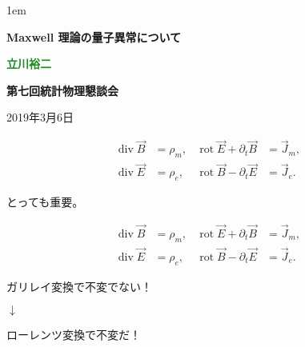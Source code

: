 \documentclass[xcolor={svgnames,rgb}]{beamer}
\date[]{}
\def\bff{\ifmmode\else\bfseries\fi}
\def\green#1{\textcolor{ForestGreen}{\bff #1}}
\def\blue#1{\textcolor{myblue}{\bff #1}}
\begin{document}
\parskip1em 
\boldmath
\def\baselinestretch{1.1}



\def\inc#1{\vcenter{\hbox{\texttt{[image: \#1]}}}}
\def\incc#1{\vcenter{\hbox{\texttt{[image: \#1]}}}}

\begin{frame}
\bigskip\bigskip\bigskip\bigskip\bigskip

\vfill


\begin{exampleblock}{}
\begin{center}\LARGE\bfseries
\color{math}
Maxwell 理論の量子異常について
\end{center}
\end{exampleblock}

\bigskip\bigskip\bigskip
\begin{center}
\large  \green{立川裕二}  

\bigskip
\large \blue{第七回統計物理懇談会}

\bigskip
\large 2019年3月6日
\end{center}
\bigskip\bigskip\bigskip
\vfill


\end{frame}



\def\div{\mathop{\mathrm{div}}}
\def\rot{\mathop{\mathrm{rot}}}
\begin{frame}
\LARGE
\begin{align*}
\div \vec B&=\rho_m,  &\rot \vec E + \partial_t \vec B&=\vec J_m, \\
\div \vec E&=\rho_e, & \rot \vec B - \partial_t \vec E&=\vec J_e.
\end{align*}
\begin{center}

\bigskip\bigskip

とっても重要。
\end{center}

\end{frame}

\begin{frame}
\LARGE
\begin{align*}
\div \vec B&=\rho_m,  &\rot \vec E + \partial_t \vec B&=\vec J_m, \\
\div \vec E&=\rho_e, & \rot \vec B - \partial_t \vec E&=\vec J_e.
\end{align*}
\begin{center}
ガリレイ変換で不変でない！ 

$\downarrow$

ローレンツ変換で不変だ！
\end{center}

\end{frame}
\end{document}
